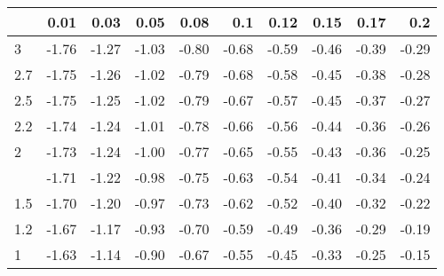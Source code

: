 
\begin{tabular}{lrrrrrrrrr}
\toprule
  & 0.01 & 0.03 & 0.05 & 0.08 & 0.1 & 0.12 & 0.15 & 0.17 & 0.2\\
\midrule
3 & -1.76 & -1.27 & -1.03 & -0.80 & -0.68 & -0.59 & -0.46 & -0.39 & -0.29\\
2.7 & -1.75 & -1.26 & -1.02 & -0.79 & -0.68 & -0.58 & -0.45 & -0.38 & -0.28\\
2.5 & -1.75 & -1.25 & -1.02 & -0.79 & -0.67 & -0.57 & -0.45 & -0.37 & -0.27\\
2.2 & -1.74 & -1.24 & -1.01 & -0.78 & -0.66 & -0.56 & -0.44 & -0.36 & -0.26\\
2 & -1.73 & -1.24 & -1.00 & -0.77 & -0.65 & -0.55 & -0.43 & -0.36 & -0.25\\
\addlinespace
1.7 & -1.71 & -1.22 & -0.98 & -0.75 & -0.63 & -0.54 & -0.41 & -0.34 & -0.24\\
1.5 & -1.70 & -1.20 & -0.97 & -0.73 & -0.62 & -0.52 & -0.40 & -0.32 & -0.22\\
1.2 & -1.67 & -1.17 & -0.93 & -0.70 & -0.59 & -0.49 & -0.36 & -0.29 & -0.19\\
1 & -1.63 & -1.14 & -0.90 & -0.67 & -0.55 & -0.45 & -0.33 & -0.25 & -0.15\\
\bottomrule
\end{tabular}
